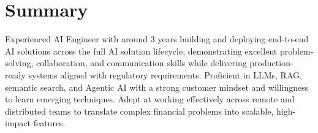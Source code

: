 \documentclass[letterpaper,11pt]{article}
\begin{document}

\vspace{4pt}
\section{Summary}
\vspace{-4pt}
\small{Experienced AI Engineer with around 3 years building and deploying end-to-end AI solutions across the full AI solution lifecycle, demonstrating excellent problem-solving, collaboration, and communication skills while delivering production-ready systems aligned with regulatory requirements. Proficient in LLMs, RAG, semantic search, and Agentic AI with a strong customer mindset and willingness to learn emerging techniques. Adept at working effectively across remote and distributed teams to translate complex financial problems into scalable, high-impact features.}
\vspace{2pt}
\end{document}
